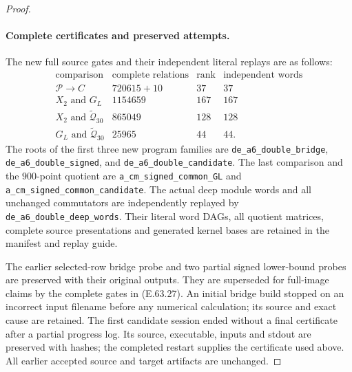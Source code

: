 \begin{proof}
\paragraph{Complete certificates and preserved attempts.}
The new full source gates and their independent
literal replays are as follows:
\[
 \begin{array}{l|r|r|l}
 \text{comparison}&\text{complete relations}&\text{rank}
                                      &\text{independent words}\\\hline
 \mathcal P\to C&720615+10&37&37\\
 X_2\text{ and }G_L&1154659&167&167\\
 X_2\text{ and }\widetilde{\mathcal Q}_{30}&865049&128&128\\
 G_L\text{ and }\widetilde{\mathcal Q}_{30}&25965&44&44.
 \end{array}
 \tag{E.63.27}
\]
The roots of the first three new program families
are \texttt{de\_a6\_double\_bridge},
\texttt{de\_a6\_double\_signed}, and
\texttt{de\_a6\_double\_candidate}.
The last comparison and the $900$-point quotient
are \texttt{a\_cm\_signed\_common\_GL} and
\texttt{a\_cm\_signed\_common\_candidate}.
The actual deep module words and all unchanged
commutators are independently replayed by
\texttt{de\_a6\_double\_deep\_words}.
Their literal word DAGs, all quotient matrices,
complete source presentations and generated
kernel bases are retained in the manifest and
replay guide.

The earlier selected-row bridge probe and two
partial signed lower-bound probes are preserved
with their original outputs. They are superseded
for full-image claims by the complete gates in
\textup{(E.63.27)}. An initial bridge build stopped
on an incorrect input filename before any numerical
calculation; its source and exact cause are retained.
The first candidate session ended without a final
certificate after a partial progress log. Its
source, executable, inputs and stdout are preserved
with hashes; the completed restart supplies the
certificate used above. All earlier accepted
source and target artifacts are unchanged.



\end{proof}
